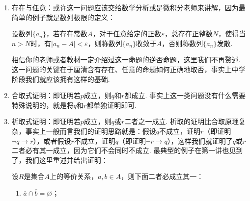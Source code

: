 \begin{enumerate}
          \begin{example*}
              证明：欧拉常数存在，或者说数列
              \[a_n=1+\dfrac{1}{2}+\cdots+\dfrac{1}{n}-\ln n\]
              有极限（极限值记为$\gamma$，称之为欧拉常数）.
          \end{example*}
          \begin{proof}
              高中熟知对数不等式
              \[\frac{x}{1+x}\leqslant\ln(1+x)\leqslant x,\enspace x>-1,\]
              这一不等式使用求导的方法即可证明，等号成立当且仅当$x=0$，因此我们令$x=\dfrac{1}{n}$，则
              \[\frac{1}{n+1}<\ln\left(1+\frac{1}{n}\right)<\frac{1}{n},\]
              基于此，我们有
              \[a_{n+1}-a_n=\frac{1}{n+1}-\ln\left(1+\frac{1}{n}\right)<0,\]
              因此数列$\{a_n\}$单调递减，又因为
              \begin{align*}
                  x_n & =\sum\limits_{k=1}^n\frac{1}{k}-\ln(\frac{n}{n-1}\cdot \frac{n-1}{n-2}\cdots\frac{2}{1}) \\
                      & =\sum\limits_{k=1}^n\frac{1}{k}-\sum\limits_{k=1}^{n-1}\ln(1+\frac{1}{k})                \\
                      & =\sum\limits_{k=1}^n\left(\frac{1}{k}-\ln(1+\frac{1}{k})\right)+\frac{1}{n}              \\
                      & >\frac{1}{n}>0,
              \end{align*}
              因此数列$\{a_n\}$有下界，因此数列$\{a_n\}$收敛.
          \end{proof}

    \item 存在与任意：或许这一问题应该交给数学分析或是微积分老师来讲解，因为最简单的例子就是数列极限的定义：
          \begin{definition}
              设数列$\{a_n\}$，若存在常数$A$，对于任意给定的正数$\varepsilon$，总存在正整数$N$，使得当$n>N$时，有$|a_n-A|<\varepsilon$，则称数列$\{a_n\}$收敛于$A$，否则称数列$\{a_n\}$发散.
          \end{definition}

          相信你的老师或者教材一定介绍过这一命题的逆否命题，这里我们不再赘述. 这一问题的关键在于厘清含有存在、任意的命题如何正确地取否，事实上中学阶段我们就应该拥有这样的基础.

    \item 合取式证明：即证明若$p$成立，则$q$和$r$都成立. 事实上这一类问题没有什么需要特殊说明的，就是将$q$和$r$都单独证明即可.

    \item 析取式证明：即证明若$p$成立，则$q$或$r$二者之一成立. 析取的证明比合取原理复杂，事实上一般而言我们的证明思路就是：假设$q$不成立，证明$r$（即证明$\lnot q\to r$），或者假设$r$不成立，证明$q$（即证明$\lnot r\to q$），这样我们就证明了$q$或$r$二者必有其一成立，因为它们不会同时不成立. 最典型的例子在第一讲也见到了，我们这里重述并给出证明：
          \begin{theorem}
              设$R$是集合$A$上的等价关系，$a,b\in A$，则下面二者必成立其一：
              \begin{enumerate}
                  \item $\overline{a}\cap\overline{b}=\varnothing$；


\end{enumerate}
\end{theorem}
\end{enumerate}
